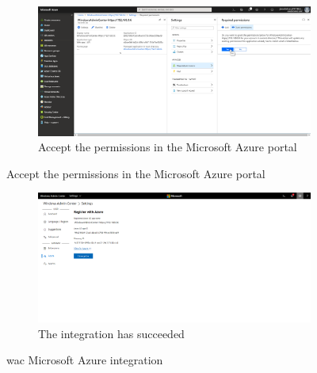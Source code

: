 \begin{figure}[h]\ContinuedFloat
\begin{subfigure}{\textwidth}
		\captionsetup{width=0.7\linewidth}
		\includegraphics[width=0.75\linewidth]{img/StandVanZaken/WAC3.png} 
		\centering
		\caption{Accept the permissions in the Microsoft Azure portal}
	\end{subfigure}
\end{figure}
\begin{figure}[h]\ContinuedFloat
	\begin{subfigure}{\textwidth}
		\captionsetup{width=0.7\linewidth}
		\includegraphics[width=0.75\linewidth]{img/StandVanZaken/WAC4.png}
		\centering
		\caption{The integration has succeeded}
	\end{subfigure}
	\caption[WAC Azure integration]{\acrfull{wac} Microsoft Azure integration}
	\label{fig:WACAzure}
\end{figure}